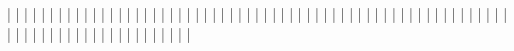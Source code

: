 |                                       |
|                                       |
|                                       |
|                                       |
|                                       |
|                                       |
|                                       |
|                                       |
|                                       |
|                                       |
|                                       |
|                                       |
|                                       |
|                                       |
|                                       |
|                                       |
|                                       |
|                                       |
|                                       |
|                                       |
|                                       |
|                                       |
|                                       |
|                                       |
|                                       |
|                                       |
|                                       |
|                                       |
|                                       |
|                                       |
|                                       |
|                                       |
|                                       |
|                                       |
|                                       |
|                                       |
|                                       |
|                                       |
|                                       |
|                                       |
|